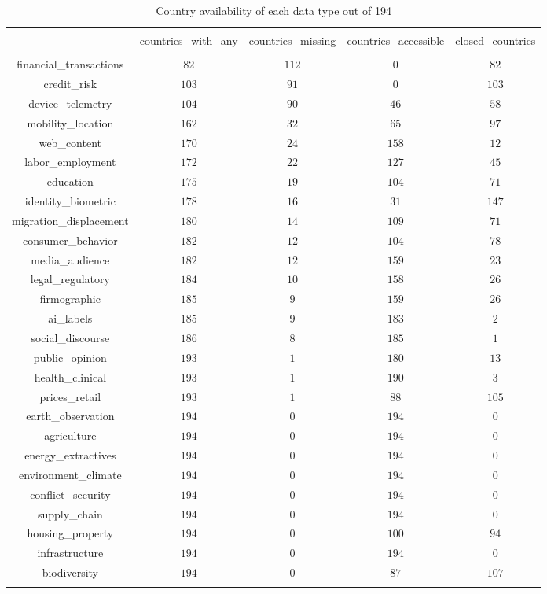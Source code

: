 
\begin{table}[!htbp] \centering 
  \caption{Country availability of each data type out of 194} 
  \label{} 
\begin{tabular}{@{\extracolsep{5pt}} ccccc} 
\\[-1.8ex]\hline 
\hline \\[-1.8ex] 
 & countries\_with\_any & countries\_missing & countries\_accessible & closed\_countries \\ 
\hline \\[-1.8ex] 
financial\_transactions & $82$ & $112$ & $0$ & $82$ \\ 
credit\_risk & $103$ & $91$ & $0$ & $103$ \\ 
device\_telemetry & $104$ & $90$ & $46$ & $58$ \\ 
mobility\_location & $162$ & $32$ & $65$ & $97$ \\ 
web\_content & $170$ & $24$ & $158$ & $12$ \\ 
labor\_employment & $172$ & $22$ & $127$ & $45$ \\ 
education & $175$ & $19$ & $104$ & $71$ \\ 
identity\_biometric & $178$ & $16$ & $31$ & $147$ \\ 
migration\_displacement & $180$ & $14$ & $109$ & $71$ \\ 
consumer\_behavior & $182$ & $12$ & $104$ & $78$ \\ 
media\_audience & $182$ & $12$ & $159$ & $23$ \\ 
legal\_regulatory & $184$ & $10$ & $158$ & $26$ \\ 
firmographic & $185$ & $9$ & $159$ & $26$ \\ 
ai\_labels & $185$ & $9$ & $183$ & $2$ \\ 
social\_discourse & $186$ & $8$ & $185$ & $1$ \\ 
public\_opinion & $193$ & $1$ & $180$ & $13$ \\ 
health\_clinical & $193$ & $1$ & $190$ & $3$ \\ 
prices\_retail & $193$ & $1$ & $88$ & $105$ \\ 
earth\_observation & $194$ & $0$ & $194$ & $0$ \\ 
agriculture & $194$ & $0$ & $194$ & $0$ \\ 
energy\_extractives & $194$ & $0$ & $194$ & $0$ \\ 
environment\_climate & $194$ & $0$ & $194$ & $0$ \\ 
conflict\_security & $194$ & $0$ & $194$ & $0$ \\ 
supply\_chain & $194$ & $0$ & $194$ & $0$ \\ 
housing\_property & $194$ & $0$ & $100$ & $94$ \\ 
infrastructure & $194$ & $0$ & $194$ & $0$ \\ 
biodiversity & $194$ & $0$ & $87$ & $107$ \\ 
\hline \\[-1.8ex] 
\end{tabular} 
\end{table} 
